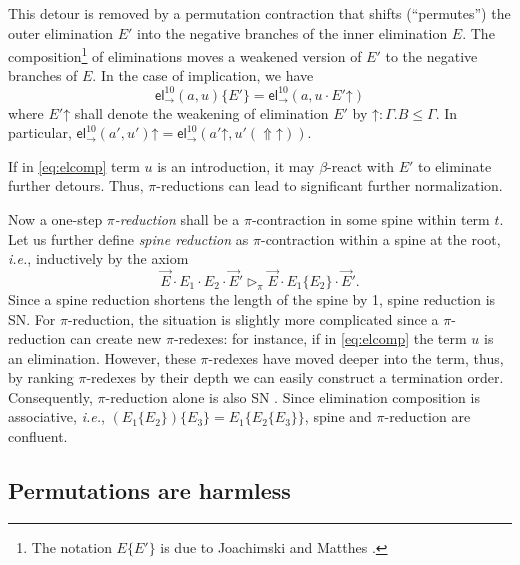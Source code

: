 \documentclass[a4paper,USenglish,cleveref, autoref, thm-restate]{lipics-v2021}
\newcommand{\ie}{\emph{i.e.}\xspace}
\newcommand{\tel}{\mathsf{el}}
\newcommand{\el}[2]{\ensuremath{\tel_{#1}^{#2}}}
\newcommand{\contract}[1][]{\mapsto_{#1}}
\newcommand{\whd}[1][]{\rhd_{#1}}
\newcommand{\red}[1][]{\longrightarrow_{#1}}
\newcommand{\Up}{\mathop{\Uparrow}}
\newcommand{\up}{\mathord{\uparrow}}
\begin{document}
This detour is removed by a permutation contraction
\fbox{$E \cdot E' \contract[\pi] E\{E'\}$} that shifts (``permutes'')
the outer elimination
$E'$ into the negative branches of the inner elimination $E$.
The composition\footnote{The notation $E\{E'\}$ is due to Joachimski
  and Matthes \cite{joachimskiMatthes:rta00}.}
 of eliminations moves a weakened
version of $E'$ to the negative branches of $E$.  In the case of
implication, we have
\begin{equation}
  \label{eq:elcomp}
  \el\to{10}(a,u) \{ E' \} = \el\to{10}(a,u \cdot E' \up)
\end{equation}
where
$E' \up$ shall denote the weakening of elimination $E'$ by
$\up : \Gamma.B \leq \Gamma$.
In particular, $\el\to{10}(a',u') \up = \el\to{10}(a' \up, u' (\Up\up))$.

\begin{remark}
  If in \cref{eq:elcomp} term $u$ is an introduction, it may $\beta$-react
  with $E'$ to eliminate further detours.  Thus, $\pi$-reductions can
  lead to significant further normalization.
\end{remark}

Now a one-step \emph{$\pi$-reduction} \fbox{$t \red[\pi] t'$} shall be a
$\pi$-contraction in some spine within term $t$.
%
Let us further define \emph{spine reduction} \fbox{$\vec E \whd[\pi] \vec E'$}
as $\pi$-contraction within a spine at the root, \ie, inductively
by the axiom
\[
  \vec E \cdot E_1 \cdot E_2 \cdot \vec E'
  \whd[\pi]
 \vec E \cdot E_1\{E_2\} \cdot \vec E'
 .
\]
Since a spine reduction shortens the length
of the spine by 1, spine reduction is SN.  For $\pi$-reduction, the
situation is slightly more complicated since a $\pi$-reduction can
create new $\pi$-redexes: for instance, if in \cref{eq:elcomp} the
term $u$ is an elimination.  However, these $\pi$-redexes have moved
deeper into the term, thus, by ranking $\pi$-redexes by their depth we
can easily construct a termination order.  Consequently,
$\pi$-reduction alone is also SN \cite[Thm.~55]{geuversHurkens:types17}.
%
Since elimination composition is associative, \ie,
$(E_1\{E_2\})\{E_3\} = E_1\{E_2\{E_3\}\}$, spine and $\pi$-reduction
are confluent.

\subsection{Permutations are harmless}
\end{document}
